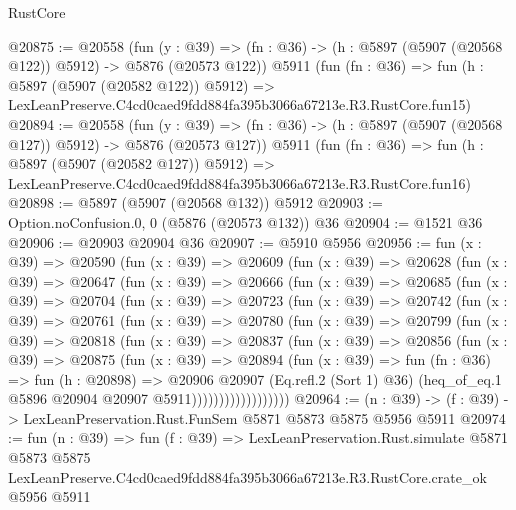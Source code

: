 \begin{lexlean}{RustCore}
\begin{coremodule}
@20875 := @20558
    (fun (y : @39) => (fn : @36) -> (h : @5897 (@5907 (@20568 @122)) @5912) -> @5876 (@20573 @122))
    @5911
    (fun (fn : @36) =>
    fun (h : @5897 (@5907 (@20582 @122)) @5912) =>
    LexLeanPreserve.C4cd0caed9fdd884fa395b3066a67213e.R3.RustCore.fun15)
@20894 := @20558
    (fun (y : @39) => (fn : @36) -> (h : @5897 (@5907 (@20568 @127)) @5912) -> @5876 (@20573 @127))
    @5911
    (fun (fn : @36) =>
    fun (h : @5897 (@5907 (@20582 @127)) @5912) =>
    LexLeanPreserve.C4cd0caed9fdd884fa395b3066a67213e.R3.RustCore.fun16)
@20898 := @5897 (@5907 (@20568 @132)) @5912
@20903 := Option.noConfusion.{0, 0} (@5876 (@20573 @132)) @36
@20904 := @1521 @36
@20906 := @20903 @20904 @36
@20907 := @5910 @5956
@20956 := fun (x : @39) =>
  @20590
    (fun (x : @39) =>
    @20609
      (fun (x : @39) =>
      @20628
        (fun (x : @39) =>
        @20647
          (fun (x : @39) =>
          @20666
            (fun (x : @39) =>
            @20685
              (fun (x : @39) =>
              @20704
                (fun (x : @39) =>
                @20723
                  (fun (x : @39) =>
                  @20742
                    (fun (x : @39) =>
                    @20761
                      (fun (x : @39) =>
                      @20780
                        (fun (x : @39) =>
                        @20799
                          (fun (x : @39) =>
                          @20818
                            (fun (x : @39) =>
                            @20837
                              (fun (x : @39) =>
                              @20856
                                (fun (x : @39) =>
                                @20875
                                  (fun (x : @39) =>
                                  @20894
                                    (fun (x : @39) =>
                                    fun (fn : @36) =>
                                    fun (h : @20898) =>
                                    @20906
                                      @20907
                                      (Eq.refl.{2} (Sort 1) @36)
                                      (heq_of_eq.{1} @5896 @20904 @20907 @5911))))))))))))))))))
@20964 := (n : @39) -> (f : @39) -> LexLeanPreservation.Rust.FunSem @5871 @5873 @5875 @5956 @5911
@20974 := fun (n : @39) =>
  fun (f : @39) =>
  LexLeanPreservation.Rust.simulate
    @5871
    @5873
    @5875
    LexLeanPreserve.C4cd0caed9fdd884fa395b3066a67213e.R3.RustCore.crate_ok
    @5956
    @5911
\end{coremodule}
\end{lexlean}
